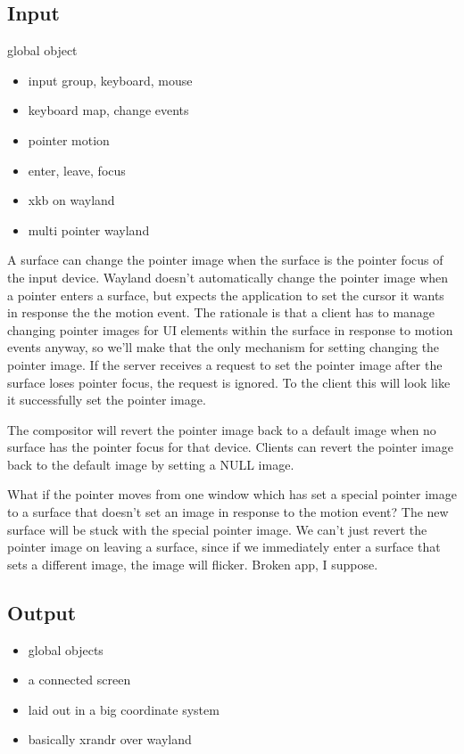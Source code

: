 \documentclass{article}
\begin{document}
\subsection{Input}

global object

\begin{itemize}
\item input group, keyboard, mouse
\item keyboard map, change events
\item pointer motion
\item enter, leave, focus
\item xkb on wayland
\item multi pointer wayland
\end{itemize}

A surface can change the pointer image when the surface is the pointer
focus of the input device.  Wayland doesn't automatically change the
pointer image when a pointer enters a surface, but expects the
application to set the cursor it wants in response the the motion
event.  The rationale is that a client has to manage changing pointer
images for UI elements within the surface in response to motion events
anyway, so we'll make that the only mechanism for setting changing the
pointer image.  If the server receives a request to set the pointer
image after the surface loses pointer focus, the request is ignored.
To the client this will look like it successfully set the pointer
image.

The compositor will revert the pointer image back to a default image
when no surface has the pointer focus for that device.  Clients can
revert the pointer image back to the default image by setting a NULL
image.

What if the pointer moves from one window which has set a special
pointer image to a surface that doesn't set an image in response to
the motion event?  The new surface will be stuck with the special
pointer image.  We can't just revert the pointer image on leaving a
surface, since if we immediately enter a surface that sets a different
image, the image will flicker.  Broken app, I suppose.

\subsection{Output}

\begin{itemize}
\item global objects
\item a connected screen
\item laid out in a big coordinate system
\item basically xrandr over wayland
\end{itemize}
\end{document}
